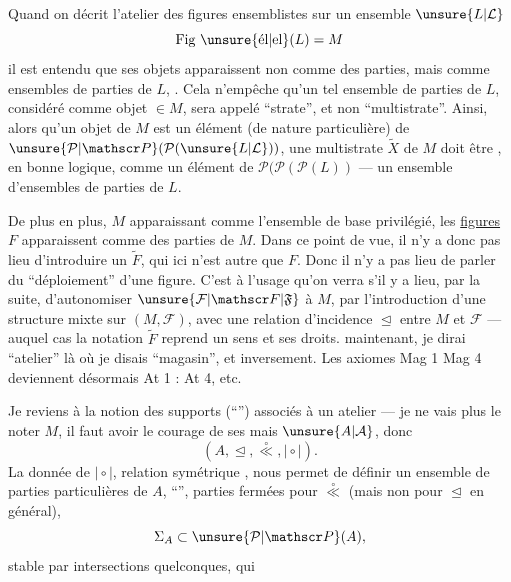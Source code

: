 Quand on décrit l'atelier des figures  ensemblistes sur un ensemble $\unsure{L|\mathcal L}$
\[
\text{Fig \unsure{él|el}}(L)=M
\]
il est entendu que ses objets apparaissent non comme des parties, mais  comme  ensembles de parties de $L$, . Cela n'empêche qu'un tel ensemble de parties de $L$, considéré comme objet $\in M$, sera appelé ``strate'', et non ``multistrate''. Ainsi,
alors qu'un objet  de $M$ est un  élément (de nature particulière) de $\unsure{\mathcal P|\mathscr P}(\mathcal P(\unsure{L|\mathcal L}))$, une multistrate $\widetilde X$ de $M$ doit être , en bonne logique, comme un élément de $\mathcal P(\mathcal P(\mathcal P(L))$ --- un ensemble d'ensembles de parties de $L$.

De plus en plus, $M$ apparaissant comme l'ensemble de base privilégié, les \uline{figures} $F$ apparaissent comme des parties de $M$. Dans ce point de vue, il n'y a donc pas lieu d'introduire un $\widetilde F$, qui ici n'est autre que $F$. Donc il n'y a pas lieu de parler du ``déploiement'' d'une figure. C'est à l'usage qu'on verra s'il y a lieu, par la suite, d'autonomiser $\unsure{\mathcal F|\mathscr F|\mathfrak F}$  à $M$, par l'introduction d'une structure mixte sur $(M,\mathcal F)$, avec une relation d'incidence $\trianglelefteq$ entre $M$ et $\mathcal F$ --- auquel cas la notation $\widetilde F$ reprend un sens et ses droits.
 maintenant, je dirai ``atelier'' là où je disais ``magasin'', et inversement. Les axiomes Mag 1  Mag 4 deviennent désormais At 1 : At 4, etc.

Je reviens à la notion des supports (``'') associés à un atelier --- je ne vais plus le noter $M$, il faut avoir le courage de ses  mais $\unsure{A|\mathcal A}$, donc
\[
(A,\trianglelefteq,\overset{\circ}{\ll},\mathrel{\mid\circ\mid}).
\]
La donnée de $\mathrel{\mid\circ\mid}$, relation symétrique , nous permet de définir un ensemble de parties particulières de $A$,  ``'', parties fermées pour $\overset{\circ}{\ll}$ (mais non pour $\trianglelefteq$ en général), 
\[
\Sigma_A\subset\unsure{\mathcal P|\mathscr P}(A),
\]
stable par intersections quelconques, qui
